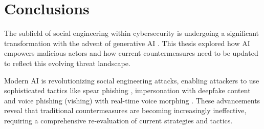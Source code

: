 


\chapter{Conclusions\label{chapter:conclusions}}
\begin{comment}

What to cover:
    - How AI has augmented SE attacks and countermeasures
    - Gap in the literature regarding SE and AI intersection?
    - Analysis on where AI-powered SE attacks might be headed in the future
        - Also about robotics and human-like actors
    - What organizations and individuals need to do regarding the evolving landscape of SE attacks
    
From course material:
    - "Yhteenveto vaatimattomimmillaan on vain lyhyt kertaus kirjoituksen keskeisistä asioista. Arvokkaamman yhteenvedon saa aikaan kommentoimalla työn tulosten arvoa, työn liittymistä ympäristöön ja tulevaisuudennäkymiä. Tällaiset arviot huolellisesti perusteltava."
    - "Yhteenvetoluku kuvaa teknisten johtopäätösten tuomaa impaktia."

\end{comment}

The subfield of social engineering within cybersecurity is undergoing a significant transformation with the advent of generative AI \citep{fakhouri_AI_Driven_Solutions_SE_Attacks_2024}. This thesis explored how AI empowers malicious actors and how current countermeasures need to be updated to reflect this evolving threat landscape.

Modern AI is revolutionizing social engineering attacks, enabling attackers to use sophisticated tactics like spear phishing \citep{basit_Comprehensive_Survey_AI_Phishing_Detection_2021}, impersonation with deepfake content \citep{mirsky_Creation_Detection_Deepfakes_2021} and voice phishing (vishing) with real-time voice morphing \citep{doan_BTSE_Audio_Deepfake_Detection_2023}. These advancements reveal that traditional countermeasures are becoming increasingly ineffective, requiring a comprehensive re-evaluation of current strategies and tactics.


